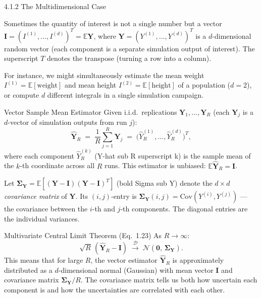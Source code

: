 \documentclass[aspectratio=169,10pt]{beamer}
\begin{document}
\begin{frame}[allowframebreaks]{4.1.2 The Multidimensional Case}

Sometimes the quantity of interest is not a single number but a vector
$\mathbf{I} = (I^{(1)}, \ldots, I^{(d)})^T = \mathbb{E}\mathbf{Y}$,
where $\mathbf{Y} = (Y^{(1)}, \ldots, Y^{(d)})^T$ is a $d$-dimensional
random vector (each component is a separate simulation output of
interest).  The superscript $T$ denotes the transpose (turning a row
into a column).

For instance, we might simultaneously estimate the mean weight
$I^{(1)} = \mathbb{E}[\text{weight}]$ and mean height
$I^{(2)} = \mathbb{E}[\text{height}]$ of a population ($d = 2$),
or compute $d$ different integrals in a single simulation campaign.

\begin{block}{Vector Sample Mean Estimator}
  Given i.i.d.\ replications $\mathbf{Y}_1, \ldots, \mathbf{Y}_R$
  (each $\mathbf{Y}_j$ is a $d$-vector of simulation outputs from run $j$):
  \[
    \hat{\mathbf{Y}}_R \;=\; \frac{1}{R}\sum_{j=1}^R \mathbf{Y}_j
      \;=\; \bigl(\hat{Y}_R^{(1)}, \ldots, \hat{Y}_R^{(d)}\bigr)^T,
  \]
  where each component $\hat{Y}_R^{(k)}$ (Y-hat sub R superscript k)
  is the sample mean of the $k$-th coordinate across all $R$ runs.
  This estimator is unbiased: $\mathbb{E}\hat{\mathbf{Y}}_R = \mathbf{I}$.
\end{block}

Let $\boldsymbol{\Sigma}_{\mathbf{Y}} = \mathbb{E}[(\mathbf{Y}-\mathbf{I})(\mathbf{Y}-\mathbf{I})^T]$
(bold Sigma sub Y) denote the $d \times d$ \emph{covariance matrix} of
$\mathbf{Y}$.  Its $(i,j)$-entry is
$\boldsymbol{\Sigma}_{\mathbf{Y}}(i,j) = \mathrm{Cov}(Y^{(i)}, Y^{(j)})$
--- the covariance between the $i$-th and $j$-th components.  The
diagonal entries are the individual variances.

\begin{block}{Multivariate Central Limit Theorem (Eq.\ 1.23)}
  As $R \to \infty$:
  \[
    \sqrt{R}\,(\hat{\mathbf{Y}}_R - \mathbf{I}) \;\xrightarrow{\mathcal{D}}\;
      \mathcal{N}\!\left(\mathbf{0},\, \boldsymbol{\Sigma}_{\mathbf{Y}}\right).
  \]
  This means that for large $R$, the vector estimator $\hat{\mathbf{Y}}_R$
  is approximately distributed as a $d$-dimensional normal (Gaussian)
  with mean vector $\mathbf{I}$ and covariance matrix
  $\boldsymbol{\Sigma}_{\mathbf{Y}}/R$.  The covariance matrix tells us
  both how uncertain each component is and how the uncertainties are
  correlated with each other.
\end{block}


\end{frame}
\end{document}
